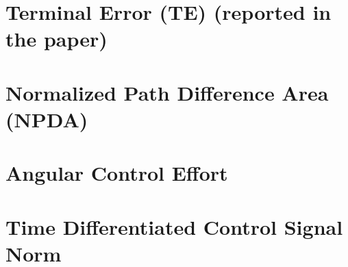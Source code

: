 \documentclass[11pt]{article}
\begin{document}
\section{Terminal Error (TE) (reported in the paper)}

\section{Normalized Path Difference Area (NPDA)}


\section{Angular Control Effort}

\section{Time Differentiated Control Signal Norm}
    
\end{document}
